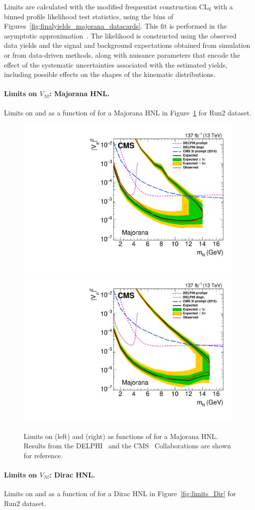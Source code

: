 Limits are calculated with the modified frequentist construction
CL$_{\mathrm{S}}$ with a binned profile likelihood
test statistics, using the bins of Figures~\ref{fig:finalyields_majorana_datacards}.
This fit is performed in the asymptotic approximation~\cite{cowan}.
The likelihood is constructed using the observed data yields and the
signal and background expectations obtained from simulation or from
data-driven methods, along with nuisance parameters that encode the
effect of the systematic uncertainties associated with the estimated
yields, including possible effects on the shapes of the kinematic
distributions.
\paragraph{Limits on $V_{Nl}$: Majorana HNL.}
Limits on \mixpare and \mixparm as a function of \mhnl for a Majorana HNL in
Figure~\ref{fig:limits_Maj} for Run2 dataset.
\begin{figure}[!ht]
    \centering
    \includegraphics[width=.48\textwidth]{Figures/paper/majorana_ele.pdf}
    \hfill
    \includegraphics[width=.48\textwidth]{Figures/paper/majorana_muo.pdf}
    \caption{\label{fig:limits_Maj}
        Limits on \mixpare (left) and \mixparm (right) as
        functions of \mhnl for a Majorana HNL. Results from the DELPHI~\cite{Abreu:1996pa}
        and the CMS~\cite{Sirunyan:2018mtv} Collaborations are shown
        for reference. \kirill
    }
\end{figure}
\paragraph{Limits on $V_{Nl}$: Dirac HNL.}
Limits on \mixpare and \mixparm as a function of \mhnl for a Dirac HNL in
Figure~\ref{fig:limits_Dir} for Run2 dataset.




